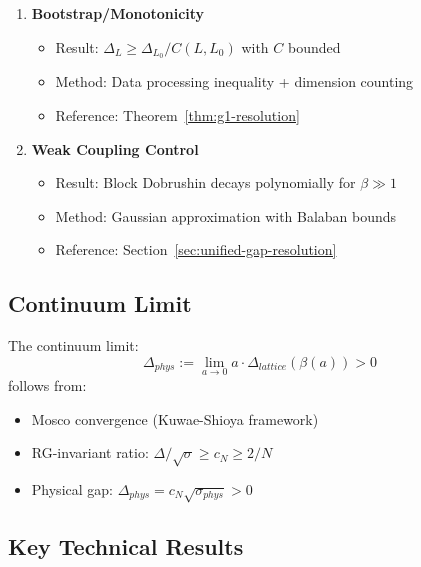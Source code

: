 \begin{enumerate}
\item[\textbf{(6)}] \textbf{Bootstrap/Monotonicity}
\begin{itemize}
\item Result: $\Delta_L \geq \Delta_{L_0} / C(L, L_0)$ with $C$ bounded
\item Method: Data processing inequality + dimension counting
\item Reference: Theorem~\ref{thm:g1-resolution}
\end{itemize}

\item[\textbf{(7)}] \textbf{Weak Coupling Control}
\begin{itemize}
\item Result: Block Dobrushin decays polynomially for $\beta \gg 1$
\item Method: Gaussian approximation with Balaban bounds
\item Reference: Section~\ref{sec:unified-gap-resolution}
\end{itemize}
\end{enumerate}

\subsection{Continuum Limit}

\begin{theorem}
\label{thm:continuum-gap-main}
The continuum limit:
\[
\Delta_{phys} := \lim_{a \to 0} a \cdot \Delta_{lattice}(\beta(a)) > 0
\]
follows from:
\begin{itemize}
\item Mosco convergence (Kuwae-Shioya framework)
\item RG-invariant ratio: $\Delta/\sqrt{\sigma} \geq c_N \geq 2/N$
\item Physical gap: $\Delta_{phys} = c_N\sqrt{\sigma_{phys}} > 0$
\end{itemize}
\end{theorem}

\subsection{Key Technical Results}

